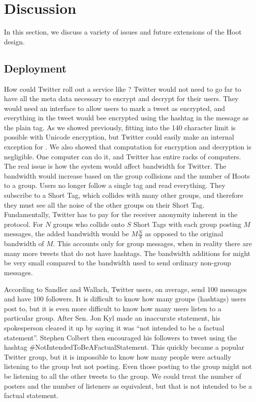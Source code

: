 \section{Discussion} \label{sec:discuss}

In this section, we discuss a variety of issues and future extensions of the Hoot design.

\subsection{Deployment}

How could Twitter roll out a service like \hoot? Twitter would not need to go far to have all the meta data necessary to encrypt and decrypt for their users. They would need an interface to allow users to mark a tweet as encrypted, and everything in the tweet would bee encrypted using the hashtag in the message as the plain tag. As we showed previously, fitting into the 140 character limit is possible with Unicode encryption, but Twitter could easily make an internal exception for \hoot. We also showed that computation for encryption and decryption is negligible. One computer can do it, and Twitter has entire racks of computers. The real issue is how the \hoot system would affect bandwidth for Twitter. The bandwidth would increase based on the group collisions and the number of Hoots to a group. Users no longer follow a single tag and read everything. They subscribe to a Short Tag, which collides with many other groups, and therefore they must see all the noise of the other groups on their Short Tag. Fundamentally, Twitter has to pay for the receiver anonymity inherent in the \hoot protocol.  For $N$ groups who collide onto $S$ Short Tags with each group posting $M$ messages, the added bandwidth would be $M\frac{N}{S}$ as opposed to the original bandwidth of $M$. This accounts only for group messages, when in reality there are many more tweets that do not have hashtags. The bandwidth additions for \hoot might be very small compared to the bandwidth used to send ordinary non-group messages.

According to Sandler and Wallach\cite{sandler09}, Twitter users, on average, send 100 messages and have 100 followers. It is difficult to know how many groups (hashtags) users post to, but it is even more difficult to know how many users listen to a particular group. After Sen. Jon Kyl made an inaccurate statement, his spokesperson cleared it up by saying it was ``not intended to be a factual statement''\cite{politico11}. Stephen Colbert then encouraged his followers to tweet using the hashtag \#NotIntendedToBeAFactualStatement. This quickly became a popular Twitter group, but it is impossible to know how many people were actually listening to the group but not posting. Even those posting to the group might not be listening to all the other tweets to the group. We could treat the number of posters and the number of listeners as equivalent, but that is not intended to be a factual statement.

